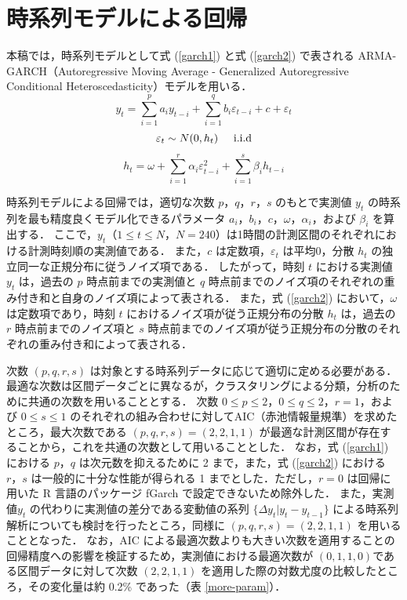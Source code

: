 \documentclass[technicalreport]{ieicej}
\begin{document}
\section{時系列モデルによる回帰}
本稿では，時系列モデルとして式 (\ref{garch1}) と式 (\ref{garch2}) で表される ARMA-GARCH（Autoregressive Moving Average - Generalized Autoregressive Conditional Heteroscedasticity）モデル\cite{arma-garch}を用いる．
\begin{equation}
y_t = \sum_{i=1}^p a_i y_{t-i} + \sum_{i=1}^q b_i \varepsilon_{t-i} + c + \varepsilon_{t} 
\label{garch1}
\end{equation}
$$\varepsilon_t \sim N(0,h_t) \hspace{0.5cm} \rm{i.i.d}$$
\begin{equation}
\displaystyle h_{t} = \omega + \sum_{i=1}^{r}\alpha_i\varepsilon_{t-i}^2 + \sum_{i=1}^{s}\beta_ih_{t-i}
\label{garch2}
\end{equation}

時系列モデルによる回帰では，適切な次数 $p，q，r，s$ のもとで実測値 $y_t$ の時系列を最も精度良くモデル化できるパラメータ $a_i，b_i，c，\omega，\alpha_i，$および $\beta_i$ を算出する．
ここで，$y_t（1\leq t\leq N，N=240）$は1時間の計測区間のそれぞれにおける計測時刻順の実測値である．
また，$c$ は定数項，$\varepsilon_t$ は平均0，分散 $h_t$ の独立同一な正規分布に従うノイズ項である．
したがって，時刻 $t$ における実測値 $y_t$ は，過去の $p$ 時点前までの実測値と $q$ 時点前までのノイズ項のそれぞれの重み付き和と自身のノイズ項によって表される．
また，式 (\ref{garch2}) において，$\omega$ は定数項であり，時刻 $t$ におけるノイズ項が従う正規分布の分散 $h_t$ は，過去の $r$ 時点前までのノイズ項と $s$ 時点前までのノイズ項が従う正規分布の分散のそれぞれの重み付き和によって表される．

次数 $(p,q,r,s)$ は対象とする時系列データに応じて適切に定める必要がある．
最適な次数は区間データごとに異なるが，クラスタリングによる分類，分析のために共通の次数を用いることとする．
次数 $0\leq p\leq2，0\leq q\leq 2，r=1$，および $0\leq s\leq 1$ のそれぞれの組み合わせに対してAIC（赤池情報量規準）\cite{aic1}\cite{aic2}を求めたところ，最大次数である $(p,q,r,s)=(2,2,1,1)$ が最適な計測区間が存在することから，これを共通の次数として用いることとした．
なお，式 (\ref{garch1}) における $p，q$ は次元数を抑えるために 2 まで，また，式 (\ref{garch2}) における $r，s$ は一般的に十分な性能が得られる 1 までとした\cite{hansen2005forecast}．ただし，$r=0$ は回帰に用いた R 言語のパッケージ fGarch で設定できないため除外した．
また，実測値$ y_t$ の代わりに実測値の差分である変動値の系列 $\{\Delta y_t | y_t - y_{t-1} \}$ による時系列解析についても検討を行ったところ，同様に $(p,q,r,s)=(2,2,1,1)$ を用いることとなった．
なお，AIC による最適次数よりも大きい次数を適用することの回帰精度への影響を検証するため，実測値における最適次数が $(0,1,1,0) $である区間データに対して次数 $(2,2,1,1)$ を適用した際の対数尤度の比較したところ，その変化量は約 0.2\% であった（表 \ref{more-param}）．
\end{document}
